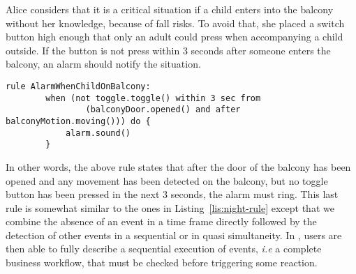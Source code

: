 \begin{description}[leftmargin=0cm]
	\item[Report unsupervised children on balcony] Alice considers that it is a critical situation if a child enters into the balcony without her knowledge, because of fall risks. To avoid that, she placed a switch button high enough that only an adult could press when accompanying a child outside. If the button is not press within 3 seconds after someone enters the balcony, an alarm should notify the situation.
	\begin{lstlisting}[language=iotdsl,label=lis:balcony-rule,caption=\IOTDSL business rules ring the alarm when Alice's child alone on balcony]
	rule AlarmWhenChildOnBalcony:	
		when (not toggle.toggle() within 3 sec from 
				(balconyDoor.opened() and after balconyMotion.moving())) do {
			alarm.sound()
		}
	\end{lstlisting}
	In other words, the above rule states that after the door of the balcony has been opened and any movement has been detected on the balcony, but no toggle button has been pressed in the next 3 seconds, the alarm must ring. This last rule is somewhat similar to the ones in Listing~\ref{lis:night-rule} except that we combine the absence of an event in a time frame directly followed by the detection of other events in a sequential or in quasi simultaneity. In \IOTDSL, users are then able to fully describe a sequential execution of events, \textit{i.e} a complete business workflow, that must be checked before triggering some \textsf{reaction}.
\end{description}
	



